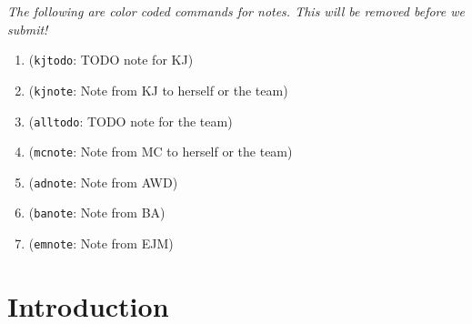 \documentclass[journal=jacsat,manuscript=article, ]{achemso}
\newcommand{\kjnote}[1]{{\color{Blue} (\texttt{kjnote}: #1)}}
\newcommand{\kjtodo}[1]{{\color{Red} (\texttt{kjtodo}: #1)}}
\newcommand{\alltodo}[1]{{\color{Cyan} (\texttt{alltodo}: #1)}}
\newcommand{\adnote}[1]{{\color{OliveGreen} (\texttt{adnote}: #1)}}
\newcommand{\banote}[1]{{\color{Salmon} (\texttt{banote}: #1)}}
\newcommand{\emnote}[1]{{\color{SeaGreen} (\texttt{emnote}: #1)}}
\newcommand{\mcnote}[1]{{\color{Plum} (\texttt{mcnote}: #1)}}
\begin{document}

\emph{The following are color coded commands for notes. This will be removed before we submit!}
\begin{enumerate}
    \item \kjtodo{TODO note for KJ}
    \item \kjnote{Note from KJ to herself or the team}
    \item \alltodo{TODO note for the team}
    \item \mcnote{Note from MC to herself or the team}
    \item \adnote{Note from AWD}
    \item \banote{Note from BA}
    \item \emnote{Note from EJM}
\end{enumerate}

\section{Introduction}

\end{document}
